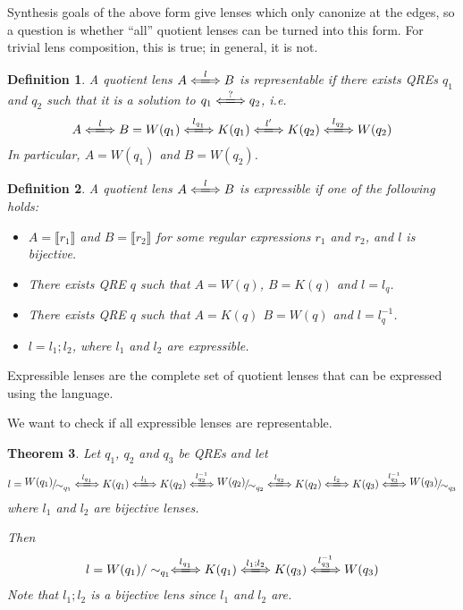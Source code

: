 \documentclass[a4paper,11pt] {article}
\theoremstyle{plain}
\newtheorem{theorem}{Theorem}[section]
\newtheorem{definition}[theorem]{Definition}
\newcommand{\lensbetween}[1]{\xLongleftrightarrow{#1}}
\newcommand{\niceFrac}[2]{%
    \raise.5ex\hbox{$#1$}%
    \kern-.1em/\kern-.15em%
    \lower.25ex\hbox{$#2$}}
\begin{document}
Synthesis goals of the above form give lenses which only canonize at
the edges, so a question is whether ``all'' quotient lenses can be
turned into this form.
For trivial lens composition, this is true;
in general, it is not.

\begin{definition}
  A quotient lens
  $A \lensbetween{l} B$
  is representable if there exists QREs $q_1$ and $q_2$ such that
  it is a solution to $q_1 \lensbetween{?} q_2$, i.e.
  \begin{align*}
    A \lensbetween{l} B =
    W(q_1) \lensbetween{l_{q_1}} K(q_1)
    \lensbetween{l'}
    K(q_2) \lensbetween{l_{q_2}} W(q_2)
  \end{align*}
  In particular, $A = W(q_1)$ and $B = W(q_2)$.
\end{definition}

\begin{definition}
  A quotient lens
  $A \lensbetween{l} B$
  is expressible if one of the following holds:
  \begin{itemize}
  \item $A = \llbracket r_1 \rrbracket$ and
    $B = \llbracket r_2 \rrbracket$ for some regular expressions
    $r_1$ and $r_2$,
    and $l$ is bijective.
  \item There exists QRE $q$ such that $A = W(q)$,
    $B = K(q)$ and $l = l_q$.
  \item There exists QRE $q$ such that $A = K(q)$
    $B = W(q)$ and $l = l_q^{-1}$.    
  \item $l = l_1 ; l_2$, where $l_1$ and $l_2$ are expressible.
  \end{itemize}
\end{definition}
Expressible lenses are the complete set of quotient lenses that can
be expressed using the language.

We want to check if all expressible lenses are representable.

\begin{theorem}
  \label{thm:composition}
  Let $q_1$, $q_2$ and $q_3$ be QREs and let
  \begin{align*}
    l = \niceFrac{W(q_1)}{\sim_{q_1}} \lensbetween{l_{q_1}} K(q_1)
    \lensbetween{l_1} K(q_2) \lensbetween{l_{q_2}^{-1}} \niceFrac{W(q_2)}{\sim_{q_2}}
    \lensbetween{l_{q_2}} K(q_2) \lensbetween{l_2} K(q_3)
    \lensbetween{l_{q_3}^{-1}} \niceFrac{W(q_3)}{\sim_{q_3}}
  \end{align*}
  where $l_1$ and $l_2$ are bijective lenses.

  Then
  \begin{align*}
    l = 
    W(q_1)/\sim_{q_1} \lensbetween{l_{q_1}} K(q_1)
    \lensbetween{l_1; l_2} K(q_3) \lensbetween{l_{q_3}^{-1}} W(q_3)
  \end{align*}
  Note that $l_1; l_2$ is a bijective lens since $l_1$ and $l_2$ are.
\end{theorem}
\end{document}
